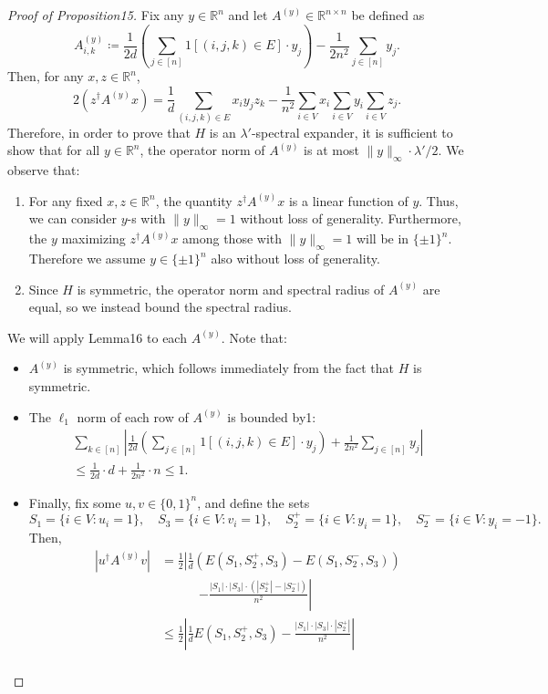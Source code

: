 \documentclass[10pt,a4paper]{article}
\begin{document}
\begin{proof}[Proof of Proposition15]
Fix any $y\in\mathbb R^n$ and let $A^{(y)}\in\mathbb R^{n\times n}$ be defined as
\[A^{(y)}_{i,k}\coloneqq\frac1{2d}\left(\sum_{j\in[n]}1[(i,j,k)\in E]\cdot y_j\right)-\frac1{2n^2}\sum_{j\in[n]}y_j.\]
Then, for any $x,z\in\mathbb R^n$,
\[2(z^{\dagger}A^{(y)}x)=\frac1d\sum_{(i,j,k)\in E}x_iy_jz_k-\frac1{n^2}\sum_{i\in V}x_i\sum_{i\in V}y_i\sum_{i\in V}z_j.\]
Therefore, in order to prove that $H$ is an $\lambda'$-spectral expander, it is sufficient to show that for all $y\in\mathbb R^n$, the operator norm of $A^{(y)}$ is at most $\|y\|_{\infty}\cdot\lambda'/2$. We observe that:
\begin{enumerate}
\item For any fixed $x,z\in\mathbb R^n$, the quantity $z^{\dagger}A^{(y)}x$ is a linear function of $y$. Thus, we can consider $y$-s with $\|y\|_{\infty}=1$ without loss of generality. Furthermore, the $y$ maximizing $z^{\dagger}A^{(y)}x$ among those with $\|y\|_{\infty}=1$ will be in $\{\pm1\}^n$. Therefore we assume $y\in\{\pm1\}^n$ also without loss of generality.
\item Since $H$ is symmetric, the operator norm and spectral radius of $A^{(y)}$ are equal, so we instead bound the spectral radius.
\end{enumerate}
We will apply Lemma16 to each $A^{(y)}$. Note that:
\begin{itemize}
\item $A^{(y)}$ is symmetric, which follows immediately from the fact that $H$ is symmetric.
\item The $\ell_1$ norm of each row of $A^{(y)}$ is bounded by1:
\begin{multline*}
\sum_{k\in[n]}\left|\frac1{2d}\left(\sum_{j\in[n]}1[(i,j,k)\in E]\cdot y_j\right)+\frac1{2n^2}\sum_{j\in[n]}y_j\right|\\
\leq\frac1{2d}\cdot d+\frac1{2n^2}\cdot n\leq1.
\end{multline*}
\item Finally, fix some $u,v\in\{0,1\}^n$, and define the sets
\[S_1=\{i\in V:u_i=1\},\quad S_3=\{i\in V:v_i=1\},\quad S_2^+=\{i\in V:y_i=1\},\quad S_2^-=\{i\in V:y_i=-1\}.\]
Then,
\begin{align*}
|u^{\dagger}A^{(y)}v|&=\frac12\left|\frac1d(E(S_1,S_2^+,S_3)-E(S_1,S_2^-,S_3))\right.\\
&\hspace{3em}\left.-\frac{|S_1|\cdot|S_3|\cdot(|S_2^+|-|S_2^-|)}{n^2}\right|\\
&\leq\frac12\left|\frac1dE(S_1,S_2^+,S_3)-\frac{|S_1|\cdot|S_3|\cdot|S_2^+|}{n^2}\right|\\

\end{align*}
\end{itemize}
\end{proof}
\end{document}
